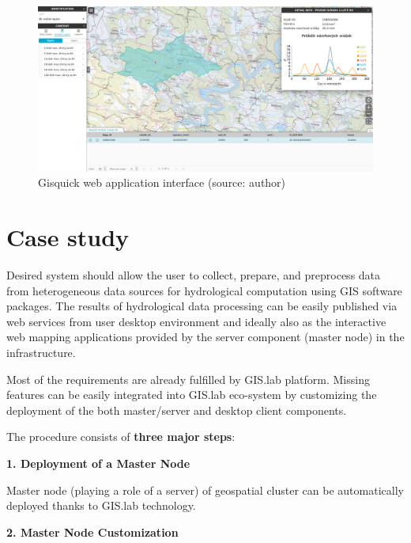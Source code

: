 \documentclass{tudelftposter}
\begin{document}
\vskip 0.25in

\begin{figure}[ht!]
\begin{center}
  \includegraphics[width=0.85\columnwidth]{gisquick-example.png}
  \caption{Gisquick web application interface
    (source: author)}
\label{fig:gislab_infrastructure}
\end{center}
\end{figure}

\section{Case study}

Desired system should allow the user to collect, prepare, and
preprocess data from heterogeneous data sources for hydrological
computation using GIS software packages. The results of hydrological
data processing can be easily published via web services from user
desktop environment and ideally also as the interactive web mapping
applications provided by the server component (master node) in the
infrastructure.

Most of the requirements are already fulfilled by GIS.lab
platform. Missing features can be easily integrated into GIS.lab
eco-system by customizing the deployment of the both master/server and
desktop client components.

\vskip 0.4in

\noindent The procedure consists of \textbf{three major steps}:

\vskip 0.1in

\textbf{1. Deployment of  a Master Node}

Master node (playing a role of a server) of geospatial cluster can be
automatically deployed thanks to GIS.lab technology.

\vskip 0.1in

\textbf{2. Master Node Customization}
\end{document}
